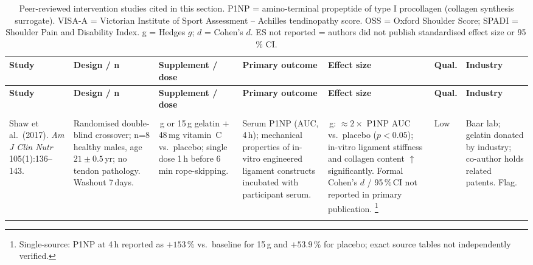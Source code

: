 \begin{longtable}{>{\raggedright\arraybackslash}p{3.2cm}
                  >{\raggedright\arraybackslash}p{2.6cm}
                  >{\raggedright\arraybackslash}p{2.8cm}
                  >{\raggedright\arraybackslash}p{3.0cm}
                  >{\raggedright\arraybackslash}p{2.2cm}
                  >{\raggedright\arraybackslash}p{1.0cm}
                  >{\raggedright\arraybackslash}p{1.5cm}}
\caption{Peer-reviewed intervention studies cited in this section.
         P1NP = amino-terminal propeptide of type I procollagen (collagen synthesis surrogate).
         VISA-A = Victorian Institute of Sport Assessment -- Achilles tendinopathy score.
         OSS = Oxford Shoulder Score; SPADI = Shoulder Pain and Disability Index.
         g = Hedges $g$; $d$ = Cohen's $d$.
         ES not reported = authors did not publish standardised effect size or 95\,\% CI.}\label{tab:suppstudy}\\
\toprule
\textbf{Study} & \textbf{Design / n} & \textbf{Supplement / dose} & \textbf{Primary outcome} & \textbf{Effect size} & \textbf{Qual.} & \textbf{Industry} \\
\midrule
\endfirsthead
\toprule
\textbf{Study} & \textbf{Design / n} & \textbf{Supplement / dose} & \textbf{Primary outcome} & \textbf{Effect size} & \textbf{Qual.} & \textbf{Industry} \\
\midrule
\endhead
\midrule
\multicolumn{7}{r}{\small\itshape Continued on next page}\\
\endfoot
\bottomrule
\endlastfoot

Shaw et al.\ (2017).
\textit{Am J Clin Nutr} 105(1):136--143. \cite{SLRE17}
&
Randomised double-blind crossover; n=8 healthy males, age $21{\pm}0.5$\,yr; no tendon pathology. Washout 7\,days.
&
5\,g or 15\,g gelatin $+$ 48\,mg vitamin~C vs.\ placebo; single dose 1\,h before 6\,min rope-skipping.
&
Serum P1NP (AUC, 4\,h); mechanical properties of in-vitro engineered ligament constructs incubated with participant serum.
&
15\,g: ${\approx}2{\times}$ P1NP AUC vs.\ placebo ($p{<}0.05$); in-vitro ligament stiffness and collagen content $\uparrow$ significantly. Formal Cohen's $d$ / 95\,\%\,CI not reported in primary publication.%
\footnote{Single-source: P1NP at 4\,h reported as $+153\,\%$ vs.\ baseline for 15\,g and $+53.9\,\%$ for placebo; exact source tables not independently verified.}
&
Low
&
Baar lab; gelatin donated by industry; co-author holds related patents. Flag.\\

\addlinespace


\end{longtable}
